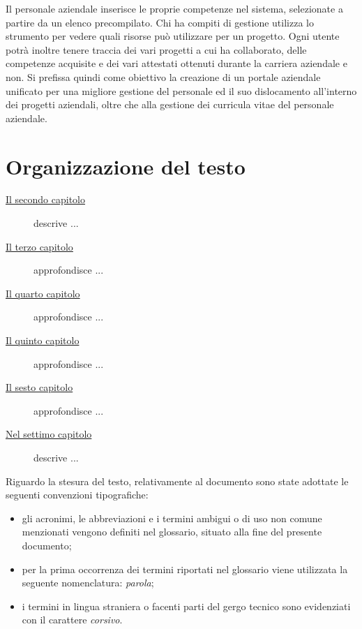 Il personale aziendale inserisce le proprie competenze nel sistema, selezionate a partire da un elenco precompilato. 
Chi ha compiti di gestione utilizza lo strumento per vedere quali risorse può utilizzare per un
progetto. Ogni utente potrà inoltre tenere traccia dei vari progetti a cui ha collaborato, delle competenze acquisite e dei vari attestati ottenuti durante la carriera aziendale e non.
Si prefissa quindi come obiettivo la creazione di un portale aziendale unificato per una migliore gestione del personale ed il suo dislocamento all’interno dei progetti aziendali, oltre che alla gestione dei curricula vitae del personale aziendale.


\section{Organizzazione del testo}

\begin{description}
    \item[{\hyperref[cap:processi-metodologie]{Il secondo capitolo}}] descrive ...
    
    \item[{\hyperref[cap:descrizione-stage]{Il terzo capitolo}}] approfondisce ...
    
    \item[{\hyperref[cap:analisi-requisiti]{Il quarto capitolo}}] approfondisce ...
    
    \item[{\hyperref[cap:progettazione-codifica]{Il quinto capitolo}}] approfondisce ...
    
    \item[{\hyperref[cap:verifica-validazione]{Il sesto capitolo}}] approfondisce ...
    
    \item[{\hyperref[cap:conclusioni]{Nel settimo capitolo}}] descrive ...
\end{description}

Riguardo la stesura del testo, relativamente al documento sono state adottate le seguenti convenzioni tipografiche:
\begin{itemize}
	\item gli acronimi, le abbreviazioni e i termini ambigui o di uso non comune menzionati vengono definiti nel glossario, situato alla fine del presente documento;
	\item per la prima occorrenza dei termini riportati nel glossario viene utilizzata la seguente nomenclatura: \emph{parola}\glsfirstoccur;
	\item i termini in lingua straniera o facenti parti del gergo tecnico sono evidenziati con il carattere \emph{corsivo}.
\end{itemize}